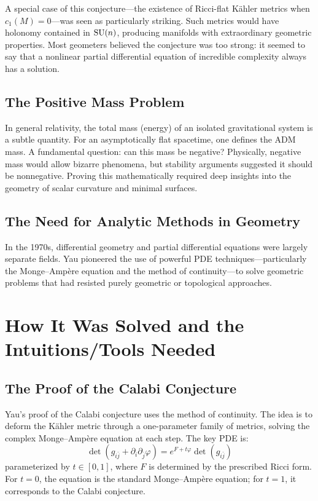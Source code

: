 A special case of this conjecture---the existence of Ricci-flat K\"ahler metrics when $c_1(M) = 0$---was seen as particularly striking. Such metrics would have holonomy contained in $\operatorname{SU}(n)$, producing manifolds with extraordinary geometric properties. Most geometers believed the conjecture was too strong: it seemed to say that a nonlinear partial differential equation of incredible complexity always has a solution.

\subsection{The Positive Mass Problem}

In general relativity, the total mass (energy) of an isolated gravitational system is a subtle quantity. For an asymptotically flat spacetime, one defines the ADM mass. A fundamental question: can this mass be negative? Physically, negative mass would allow bizarre phenomena, but stability arguments suggested it should be nonnegative. Proving this mathematically required deep insights into the geometry of scalar curvature and minimal surfaces.

\subsection{The Need for Analytic Methods in Geometry}

In the 1970s, differential geometry and partial differential equations were largely separate fields. Yau pioneered the use of powerful PDE techniques---particularly the Monge--Amp\`ere equation and the method of continuity---to solve geometric problems that had resisted purely geometric or topological approaches.

\section{How It Was Solved and the Intuitions/Tools Needed}

\subsection{The Proof of the Calabi Conjecture}

Yau's proof of the Calabi conjecture uses the method of continuity. The idea is to deform the K\"ahler metric through a one-parameter family of metrics, solving the complex Monge--Amp\`ere equation at each step. The key PDE is:
\[
\det(g_{i\bar j} + \partial_i\partial_{\bar j}\varphi) = e^{F + t\varphi} \det(g_{i\bar j})
\]
parameterized by $t \in [0,1]$, where $F$ is determined by the prescribed Ricci form. For $t = 0$, the equation is the standard Monge--Amp\`ere equation; for $t = 1$, it corresponds to the Calabi conjecture.

